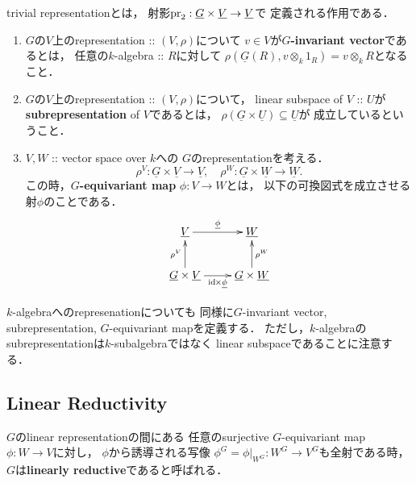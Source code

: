 \documentclass[a4paper]{jsarticle}
\newcommand{\func}[1]{\underline{#1}}
\begin{document}
    \begin{Example}
        trivial representationとは，
        射影$\pr_2: \func{G} \times \func{V} \to \func{V}$で
        定義される作用である．
    \end{Example}

    \begin{Def}
    \begin{enumerate}[label=(\roman*), leftmargin=*]
    \item 
        $G$の$V$上のrepresentation :: $(V, \rho)$について
        $v \in V$が\textbf{$G$-invariant vector}であるとは，
        任意の$k$-algebra :: $R$に対して
        $\rho(\func{G}(R), v \otimes_k 1_R)=v \otimes_k R$となること．

    \item
        $G$の$V$上のrepresentation :: $(V, \rho)$について，
        linear subspace of $V$ :: $U$が
        \textbf{subrepresentation} of $V$であるとは，
        $\rho(\func{G} \times \func{U}) \subseteq \func{U}$が
        成立しているということ．

    \item
        $V, W$ :: vector space over $k$への
        $G$のrepresentationを考える．
        \[
            \rho^V: \func{G} \times \func{V} \to \func{V}, \quad
            \rho^W: \func{G} \times \func{W} \to \func{W}.
        \]
        この時，\textbf{$G$-equivariant map} $\phi: V \to W$とは，
        以下の可換図式を成立させる射$\phi$のことである．
        \[
        \xymatrix
        {
            \func{V} \ar[r]^-{\func{\phi}}& \func{W} \\
            \func{G} \times \func{V} \ar[u]^-{\rho^V} \ar[r]_-{\id \times \func{\phi}}&
            \func{G} \times \func{W} \ar[u]_-{\rho^W}
        }
        \]
    \end{enumerate}
    $k$-algebraへのrepresenationについても
    同様に$G$-invariant vector, subrepresentation, $G$-equivariant mapを定義する．
    ただし，$k$-algebraのsubrepresentationは$k$-subalgebraではなく
    linear subspaceであることに注意する．
    \end{Def}

    \subsection{Linear Reductivity}
    \begin{Def}
        $G$のlinear representationの間にある
        任意のsurjective $G$-equivariant map $\phi: W \to V$に対し，
        $\phi$から誘導される写像
        $\phi^G=\phi|_{W^G}: W^G \to V^G$も全射である時，
        $G$は\textbf{linearly reductive}であると呼ばれる．
    \end{Def}
\end{document}

